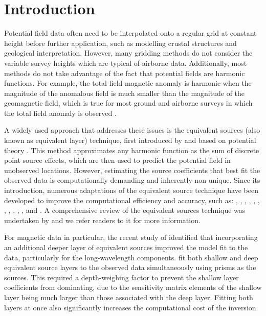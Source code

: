 
\section{Introduction}

Potential field data often need to be interpolated onto a regular grid at constant height before further application, such as modelling crustal structures and geological interpretation. However, many gridding methods do not consider the variable survey heights which are typical of airborne data. Additionally, most methods do not take advantage of the fact that potential fields are harmonic functions. For example, the total field magnetic anomaly is harmonic when the magnitude of the anomalous field is much smaller than the magnitude of the geomagnetic field, which is true for most ground and airborne surveys in which the total field anomaly is observed \citep{Blakley1995}.

A widely used approach that addresses these issues is the equivalent sources (also known as equivalent layer) technique, first introduced by \citet{Dampney1969} and based on potential theory \citep{Kellogg1967}. This method approximates any harmonic function as the sum of discrete point source effects, which are then used to predict the potential field in unobserved locations. However, estimating the source coefficients that best fit the observed data is computationally demanding and inherently non-unique. Since its introduction, numerous adaptations of the equivalent source technique have been developed to improve the computational efficiency and accuracy, such as: \citet{Leao1989}, \citet{Cordell1992}, \citet{Mendona1994}, \citet{Guspi2009}, \citet{Li2010}, \citet{OliveiraJr2013}, \citet{Siqueira2017}, \citet{Jirigalatu2019}, \citet{Mendona2020}, \citet{Li2020}, \citet{Soler2021}, \citet{Takahashi2022} and \citet{Piauilino2024}. A comprehensive review of the equivalent sources technique was undertaken by \citet{OliveiraJr2023} and we refer readers to it for more information.

For magnetic data in particular, the recent study of \citet{Li2020} identified that incorporating an additional deeper layer of equivalent sources improved the model fit to the data, particularly for the long-wavelength components. \citet{Li2020} fit both shallow and deep equivalent source layers to the observed data simultaneously using prisms as the sources. This required a depth-weighing factor to prevent the shallow layer coefficients from dominating, due to the sensitivity matrix elements of the shallow layer being much larger than those associated with the deep layer. Fitting both layers at once also significantly increases the computational cost of the inversion.

